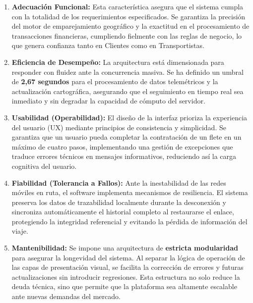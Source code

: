 \begin{enumerate}
	\item \textbf{Adecuación Funcional:} Esta característica asegura que el sistema cumpla con la totalidad de los requerimientos especificados. Se garantiza la precisión del motor de emparejamiento geográfico y la exactitud en el procesamiento de transacciones financieras, cumpliendo fielmente con las reglas de negocio, lo que genera confianza tanto en Clientes como en Transportistas.
	\item \textbf{Eficiencia de Desempeño:} La arquitectura está dimensionada para responder con fluidez ante la concurrencia masiva. Se ha definido un umbral de \textbf{2,67 segundos} para el procesamiento de datos telemétricos y la actualización cartográfica, asegurando que el seguimiento en tiempo real sea inmediato y sin degradar la capacidad de cómputo del servidor.
	\item \textbf{Usabilidad (Operabilidad):} El diseño de la interfaz prioriza la experiencia del usuario (UX) mediante principios de consistencia y simplicidad. Se garantiza que un usuario pueda completar la contratación de un flete en un máximo de cuatro pasos, implementando una gestión de excepciones que traduce errores técnicos en mensajes informativos, reduciendo así la carga cognitiva del usuario.
	\item \textbf{Fiabilidad (Tolerancia a Fallos):} Ante la inestabilidad de las redes móviles en ruta, el software implementa mecanismos de resiliencia. El sistema preserva los datos de trazabilidad localmente durante la desconexión y sincroniza automáticamente el historial completo al restaurarse el enlace, protegiendo la integridad referencial y evitando la pérdida de información del viaje.
	\item \textbf{Mantenibilidad:} Se impone una arquitectura de \textbf{estricta modularidad} para asegurar la longevidad del sistema. Al separar la lógica de operación de las capas de presentación visual, se facilita la corrección de errores y futuras actualizaciones sin introducir regresiones. Esta estructura no solo reduce la deuda técnica, sino que permite que la plataforma sea altamente escalable ante nuevas demandas del mercado.
	
\end{enumerate}
